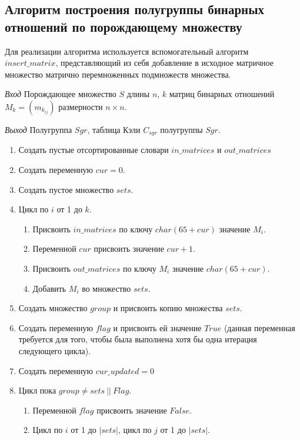 \documentclass[bachelor, och, labwork]{shiza}
\begin{document}
\subsection{Алгоритм построения полугруппы бинарных отношений по порождающему множеству}

Для реализации алгоритма используется вспомогательный алгоритм\\ $insert\_matrix$,
представляющий из себя добавление в исходное матричное множество матрично перемноженных 
подмножеств множества.

\textit{Вход} Порождающее множество $S$ длины $n$, $k$ матриц бинарных отношений 
$M_k = (m_{k_{ij}})$ размерности $n \times n$.

\textit{Выход} Полугруппа $Sgr$, таблица Кэли $C_{sgr}$ полугруппы $Sgr$.

\begin{enumerate}
    \item Создать пустые отсортированные словари $in\_matrices$ и  $out\_matrices$
    \item Создать переменную $cur=0$.
    \item Создать пустое множество $sets$.
    \item Цикл по $i$ от 1 до $k$.
        \begin{enumerate}
            \item Присвоить $in\_matrices$ по ключу $char(65 + cur)$ значение $M_i$.
            \item Переменной $cur$ присвоить значение $cur+1$.
            \item Присвоить $out\_matrices$ по ключу $M_i$ значение $char(65 + cur)$.
            \item Добавить $M_i$ во множество $sets$.
        \end{enumerate}
    \item Создать множество $group$ и присвоить копию множества $sets$.
    \item Создать переменную $flag$ и присвоить ей значение $True$ (данная переменная
    требуется для того, чтобы была выполнена хотя бы одна итерация следующего цикла).
    \item Создать переменную $cur\_updated=0$
    \item Цикл пока $group \not = sets ~||~ Flag$.
        \begin{enumerate}
            \item Переменной $flag$ присвоить значение $False$.
            \item Цикл по $i$ от 1 до $|sets|$, цикл по $j$ от 1 до $|sets|$.

\end{enumerate}
\end{enumerate}
\end{document}
